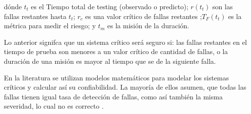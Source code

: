   dónde $t_t$ es el Tiempo total de testing (observado o predicto); $r(t_t)$ son las fallas restantes hasta $t_t$; $r_c$ es una valor crítico de fallas restantes ;$T_F(t_t)$ es la métrica para medir el riesgo; y $t_m$ es la misión de la duración.

  Lo anterior signifca que un sistema crítico será seguro si: las fallas restantes en el tiempo de prueba son menores a un valor crítico de cantidad de fallas, o la duración de una misión es mayor al tiempo que se de la siguiente falla.
  
 En la literatura se utilizan modelos matemáticos para modelar los sistemas críticos y calcular así su confiabilidad. La mayoría de ellos asumen, que todas las fallas tienen igual tasa de detección de fallas, como así también la misma severidad, lo cual no es correcto \cite{Liu14}.
